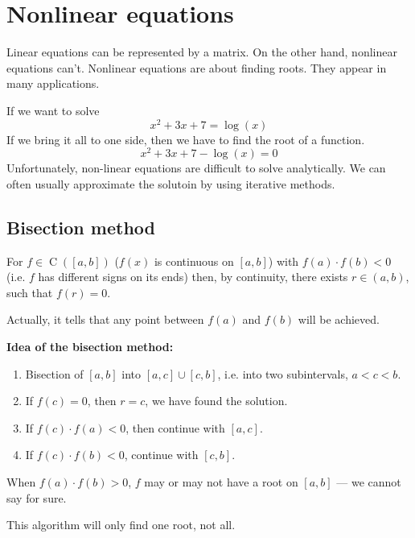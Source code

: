 
\pagebreak
\section{Nonlinear equations}
Linear equations can be represented by a matrix. On the other hand, nonlinear equations can't.
Nonlinear equations are about finding roots. They appear in many applications.

\begin{example}
    If we want to solve
    \[ x^2 + 3x + 7 = \log(x) \]
    If we bring it all to one side, then we have to find the root of a function.
    \[ x^2 + 3x + 7 - \log(x) = 0 \]
    Unfortunately, non-linear equations are difficult to solve analytically.
    We can often usually approximate the solutoin by using iterative methods.
\end{example}

\subsection{Bisection method}
\begin{theorem}
    For $f \in \operatorname{C}([a, b])$ ($f(x)$ is continuous on $[a, b]$)
    with $f(a) \cdot f(b) < 0$ (i.e. $f$ has different signs on its ends)
    then, by continuity, there exists $r \in (a, b)$, such that
    $f(r) = 0$.
\end{theorem}
\begin{remark}
    Actually, it tells that any point between $f(a)$ and $f(b)$ will be achieved.
\end{remark}

\textbf{Idea of the bisection method:}
\begin{enumerate}
    \item {
        Bisection of $[a, b]$ into $[a, c] \cup [c, b]$, i.e.
        into two subintervals, $a < c < b$.
    }
    \item {
        If $f(c) = 0$, then $r = c$, we have found the solution.
    }
    \item {
        If $f(c) \cdot f(a) < 0$, then continue with $[a, c]$.
    }
    \item {
        If $f(c) \cdot f(b) < 0$, continue with $[c, b]$.
    }
\end{enumerate}
\begin{remark}
    When $f(a) \cdot f(b) > 0$, $f$ may or may not have a root on $[a, b]$ ---
    we cannot say for sure.
\end{remark}
\begin{remark}
    This algorithm will only find one root, not all.
\end{remark}

